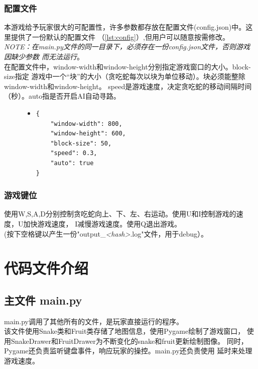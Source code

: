 \documentclass[a4paper]{article}
\begin{document}
\subsubsection{配置文件}
本游戏给予玩家很大的可配置性，许多参数都存放在配置文件(config.json)中。这里提供了一份默认的配置文件
（\autoref{lst:config}）,但用户可以随意按需修改。\\

\emph{NOTE：在main.py文件的同一目录下，必须存在一份config.json文件，否则游戏因缺少参数
而无法运行}。\\

在配置文件中，window-width和window-height分别指定游戏窗口的大小。block-size指定
游戏中一个``块''的大小（贪吃蛇每次以块为单位移动）。块必须能整除window-width和window-height。
speed是游戏速度，决定贪吃蛇的移动间隔时间（秒）。auto指是否开启AI自动寻路。

\begin{figure}[!hbt]
\begin{itemize}
\item[] \begin{lstlisting}[style=mypython, label=lst:config, caption=config.json配置文件（默认）]
{
    "window-width": 800,
    "window-height": 600,
    "block-size": 50,
    "speed": 0.3,
    "auto": true
}
\end{lstlisting}
\end{itemize}
\end{figure}

\subsubsection{游戏键位}
使用W,S,A,D分别控制贪吃蛇向上、下、左、右运动。使用U和I控制游戏的速度，U加快游戏速度，
I减慢游戏速度。使用Q退出游戏。\\

(按下空格键以产生一份"output\_\emph{<hash>}.log"文件，用于debug）。

\section{代码文件介绍}
\subsection{主文件 main.py}
main.py调用了其他所有的文件，是玩家直接运行的程序。\\

该文件使用Snake类和Fruit类存储了地图信息，使用Pygame绘制了游戏窗口，
使用SnakeDrawer和FruitDrawer为不断变化的snake和fruit更新绘制图像。
同时，Pygame还负责监听键盘事件，响应玩家的操控。main.py还负责使用
延时来处理游戏速度。
\end{document}
